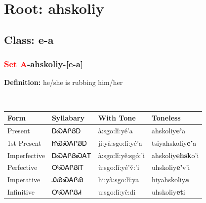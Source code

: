 \needspace{4in}
\section*{Root: ahskoliy}
\nopagebreak
{}
\needspace{3in}
\subsection*{Class: e-a}
\nopagebreak
\needspace{2in}
\subsubsection*{\textcolor{Red}{Set A}{-}\textbf{ahskoliy}{-}[e-a]}
\nopagebreak
\textbf{Definition: } he/she is rubbing him/her
\\[0.5em]
\begin{tabularx}{\textwidth}{l X X X}%
\toprule%
\textbf{Form}&\textbf{Syllabary}&\textbf{With Tone}&\textbf{Toneless}\\%
\midrule%
Present&ᎠᏍᎪᎵᏰᎠ&à:sgo:lǐ:yé’a&ahskoliy\textbf{e'}a\\%
1st Present&ᏥᏯᏍᎪᎵᏰᎠ&ji:yà:sgo:lǐ:yé’a&tsiyahskoliy\textbf{e'}a\\%
Imperfective&ᎠᏍᎪᎵᏰᏍᎪᎢ&à:sgo:lǐ:yê:sgó:’i&ahskoliy\textbf{ehsk}o'i\\%
Perfective&ᎤᏍᎪᎵᏰᎥᎢ&ù:sgo:lǐ:yé’v̌:’i&uhskoliy\textbf{e'}v'i\\%
Imperative&ᎯᏯᏍᎪᎵᏯ&hi:yà:sgo:lǐ:ya&hiyahskoliy\textbf{a}\\%
Infinitive&ᎤᏍᎪᎵᏰᏗ&u:sgo:lǐ:yê:di&uhskoliy\textbf{et}i\\%
\bottomrule%
\end{tabularx}
\\[1em]
